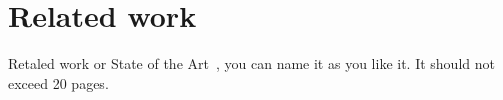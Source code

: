 \normalfont\normalsize
\chapter{Related work}

Retaled work or State of the Art~\cite{Russ2003, Dejo1989, Kama2006, CellRedBook, PotentialScientificComputing, CBEA}, you can name it as you like it. It should not exceed 20 pages.

